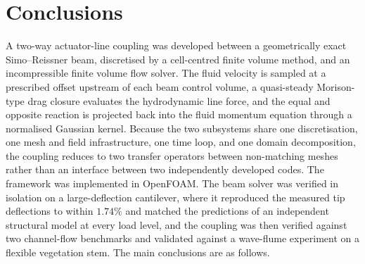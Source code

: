 \section{Conclusions}
\label{sec:conclusion}

\noindent
A two-way actuator-line coupling was developed between a geometrically exact Simo--Reissner beam, discretised by a cell-centred finite volume method, and an incompressible finite volume flow solver. The fluid velocity is sampled at a prescribed offset upstream of each beam control volume, a quasi-steady Morison-type drag closure evaluates the hydrodynamic line force, and the equal and opposite reaction is projected back into the fluid momentum equation through a normalised Gaussian kernel. Because the two subsystems share one discretisation, one mesh and field infrastructure, one time loop, and one domain decomposition, the coupling reduces to two transfer operators between non-matching meshes rather than an interface between two independently developed codes. The framework was implemented in OpenFOAM. The beam solver was verified in isolation on a large-deflection cantilever, where it reproduced the measured tip deflections to within $1.74\%$ and matched the predictions of an independent structural model at every load level, and the coupling was then verified against two channel-flow benchmarks and validated against a wave-flume experiment on a flexible vegetation stem. The main conclusions are as follows.

